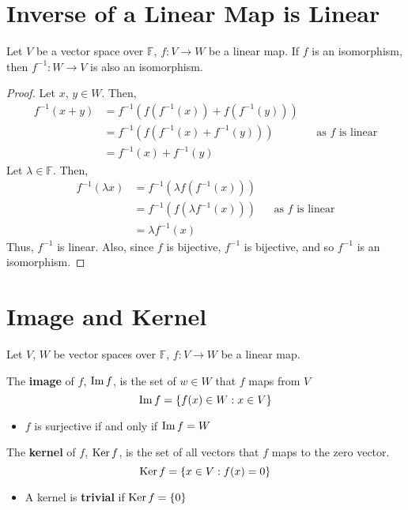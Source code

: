 \documentclass[letterpaper,12pt]{article}
\begin{document}
\section*{Inverse of a Linear Map is Linear}
\begin{theorem}
Let $V$ be a vector space over $\mathbb{F}$, $f: V \rightarrow W$ be a linear map. If $f$ is an isomorphism, then $f^{-1}: W \rightarrow V$ is also an isomorphism.
\end{theorem}
\begin{proof}
Let $x$, $y \in W$. Then,
\begin{align*}
    f^{-1}(x + y) & = f^{-1}(f(f^{-1}(x)) + f(f^{-1}(y))) \\
    & = f^{-1}(f(f^{-1}(x) + f^{-1}(y))) && \text{as $f$ is linear} \\
    & = f^{-1}(x) + f^{-1}(y)
\end{align*}
Let $\lambda \in \mathbb{F}$. Then,
\begin{align*}
    f^{-1}(\lambda x) & = f^{-1}(\lambda f(f^{-1}(x))) \\
    & = f^{-1}(f(\lambda f^{-1}(x))) && \text{as $f$ is linear} \\
    & = \lambda f^{-1}(x)
\end{align*}
Thus, $f^{-1}$ is linear. Also, since $f$ is bijective, $f^{-1}$ is bijective, and so $f^{-1}$ is an isomorphism.
\end{proof}

\section*{Image and Kernel}
Let $V$, $W$ be vector spaces over $\mathbb{F}$, $f: V \rightarrow W$ be a linear map.
\begin{definition}
The \textbf{image} of $f$, $\operatorname{Im}{f}$, is the set of $w \in W$ that $f$ maps from $V$
\begin{equation*}
    \operatorname{Im}{f} = \left\{ f(x) \in W: x \in V \right\}
\end{equation*}
\begin{itemize}
    \item $f$ is surjective if and only if $\operatorname{Im}{f} = W$
\end{itemize}
\end{definition}

\begin{definition}
The \textbf{kernel} of $f$, $\operatorname{Ker}{f}$, is the set of all vectors that $f$ maps to the zero vector.
\begin{equation*}
    \operatorname{Ker}{f} = \left\{ x \in V: f(x) = 0 \right\}
\end{equation*}
\begin{itemize}
    \item A kernel is \textbf{trivial} if $\operatorname{Ker}{f} = \left\{ 0 \right\}$
\end{itemize}
\end{definition}
\end{document}
